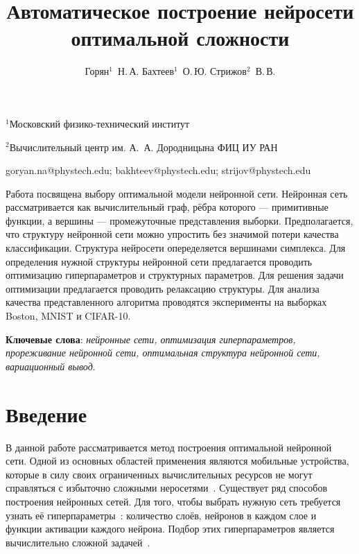 \documentclass[12pt,twoside]{article}
\begin{document}
\title
    {Автоматическое построение нейросети оптимальной сложности}
\author
    {Горян$^1$~Н.\,А. Бахтеев$^1$~О.\,Ю.  Стрижов$^2$~В.\,В.} %

\organization
    {$^1$Московский физико-технический институт\par
    $^2$Вычислительный центр им. А.~А. Дородницына ФИЦ ИУ РАН}

\email
    {goryan.na@phystech.edu; bakhteev@phystech.edu; strijov@phystech.edu}    


    

\abstract
	{Работа посвящена выбору оптимальной модели нейронной сети. Нейронная сеть рассматривается как вычислительный граф, рёбра которого --- примитивные функции, а вершины --- промежуточные представления выборки. Предполагается, что структуру нейронной сети можно упростить без значимой потери качества классификации. Структура нейросети опеределяется вершинами симплекса. Для определения нужной структуры нейронной сети предлагается проводить оптимизацию гиперпараметров и структурных параметров. Для решения задачи оптимизации предлагается проводить релаксацию структуры. Для анализа качества представленного алгоритма проводятся эксперименты на выборках Boston, MNIST и CIFAR-10.
\bigskip

\textbf{Ключевые слова}: \emph {нейронные сети, оптимизация гиперпараметров, прореживание нейронной сети, оптимальная структура нейронной сети, вариационный вывод}.
}


\maketitle


\section{ Введение}
	
	В данной работе рассматривается метод построения оптимальной нейронной сети. Одной из основных областей применения являются мобильные устройства, которые в силу своих ограниченных вычислительных ресурсов не могут справляться с избыточно сложными неросетями~\cite{rallapalli2016very}. Существует ряд способов построения нейронных сетей. Для того, чтобы выбрать нужную сеть требуется узнать её гиперпараметры~\cite{Myung1997}: количество слоёв, нейронов в каждом слое и функции активации каждого нейрона. Подбор этих гиперпараметров является вычислительно сложной задачей~\cite{sutskever2014}.
	
\end{document}
